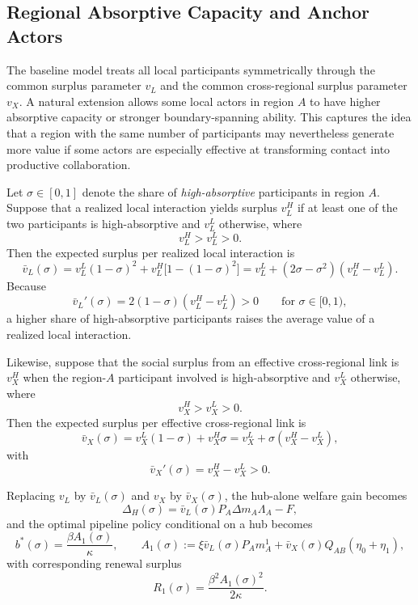 \subsection{Regional Absorptive Capacity and Anchor Actors}

The baseline model treats all local participants symmetrically through the common surplus parameter $v_L$ and the common cross-regional surplus parameter $v_X$. A natural extension allows some local actors in region $A$ to have higher absorptive capacity or stronger boundary-spanning ability. This captures the idea that a region with the same number of participants may nevertheless generate more value if some actors are especially effective at transforming contact into productive collaboration.

Let $\sigma\in[0,1]$ denote the share of \emph{high-absorptive} participants in region $A$. Suppose that a realized local interaction yields surplus $v_L^H$ if at least one of the two participants is high-absorptive and $v_L^L$ otherwise, where
\[
v_L^H>v_L^L>0.
\]
Then the expected surplus per realized local interaction is
\begin{equation}
\bar v_L(\sigma)
=
v_L^L(1-\sigma)^2
+
v_L^H\bigl[1-(1-\sigma)^2\bigr]
=
v_L^L+(2\sigma-\sigma^2)(v_L^H-v_L^L).
\label{eq:vbarL_sigma}
\end{equation}
Because
\begin{equation}
\bar v_L'(\sigma)=2(1-\sigma)(v_L^H-v_L^L)>0
\qquad
\text{for } \sigma\in[0,1),
\label{eq:vbarL_prime}
\end{equation}
a higher share of high-absorptive participants raises the average value of a realized local interaction.

Likewise, suppose that the social surplus from an effective cross-regional link is $v_X^H$ when the region-$A$ participant involved is high-absorptive and $v_X^L$ otherwise, where
\[
v_X^H>v_X^L>0.
\]
Then the expected surplus per effective cross-regional link is
\begin{equation}
\bar v_X(\sigma)
=
v_X^L(1-\sigma)+v_X^H\sigma
=
v_X^L+\sigma(v_X^H-v_X^L),
\label{eq:vbarX_sigma}
\end{equation}
with
\begin{equation}
\bar v_X'(\sigma)=v_X^H-v_X^L>0.
\label{eq:vbarX_prime}
\end{equation}

Replacing $v_L$ by $\bar v_L(\sigma)$ and $v_X$ by $\bar v_X(\sigma)$, the hub-alone welfare gain becomes
\begin{equation}
\Delta_H(\sigma)
=
\bar v_L(\sigma)P_A\Delta m_A\Lambda_A-F,
\label{eq:DeltaH_sigma}
\end{equation}
and the optimal pipeline policy conditional on a hub becomes
\begin{equation}
b^*(\sigma)
=
\frac{\beta A_1(\sigma)}{\kappa},
\qquad
A_1(\sigma):=
\xi \bar v_L(\sigma)P_A m_A^1
+
\bar v_X(\sigma)Q_{AB}(\eta_0+\eta_1),
\label{eq:bstar_sigma}
\end{equation}
with corresponding renewal surplus
\begin{equation}
R_1(\sigma)
=
\frac{\beta^2 A_1(\sigma)^2}{2\kappa}.
\label{eq:R_sigma}
\end{equation}

